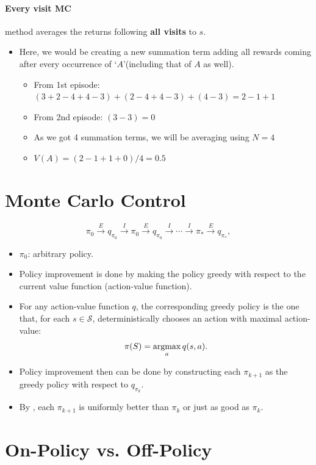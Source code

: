 \paragraph{Every visit MC} method averages the returns following \textbf{all visits} to $s$.
\begin{itemize}
	\item Here, we would be creating a new summation term adding all rewards coming after every occurrence of `$A$'(including that of $A$ as well).
		\begin{itemize}
			\item From 1st episode: $(3+2-4+4-3)+(2-4+4-3)+(4-3)=2-1+1$
			\item From 2nd episode: $(3-3)=0$
			\item As we got 4 summation terms, we will be averaging using $N=4$ \ie
			\item $V(A)=(2-1+1+0)/4=0.5$
		\end{itemize}
\end{itemize}



\section{Monte Carlo Control}
$$\pi_0\xrightarrow{\,E\,} q_{\pi_0} \xrightarrow{\,I\,} \pi_0\xrightarrow{\,E\,} q_{\pi_0}\xrightarrow{\,I\,}\cdots \xrightarrow{\,I\,} \pi_*\xrightarrow{\,E\,} q_{\pi_*},$$
\begin{itemize}
	\item $\pi_0$: arbitrary policy.
	\item Policy improvement is done by making the policy greedy with respect to the current value function (action-value function). 
	\item For any action-value function $q$, the corresponding greedy policy is the one that, for each $s\in \mathcal{S}$, deterministically chooses an action with maximal action-value:
		$$\pi(S) = \operatorname*{\operatorname{argmax}}_a q(s,a).$$
	\item Policy improvement then can be done by constructing each $\pi_{k+1}$ as the greedy policy with respect to $q_{\pi_k}.$
	\item By , each $\pi_{k+1}$ is uniformly better than $\pi_k$ or just as good as $\pi_k$.
\end{itemize}


\section{On-Policy vs. Off-Policy}
